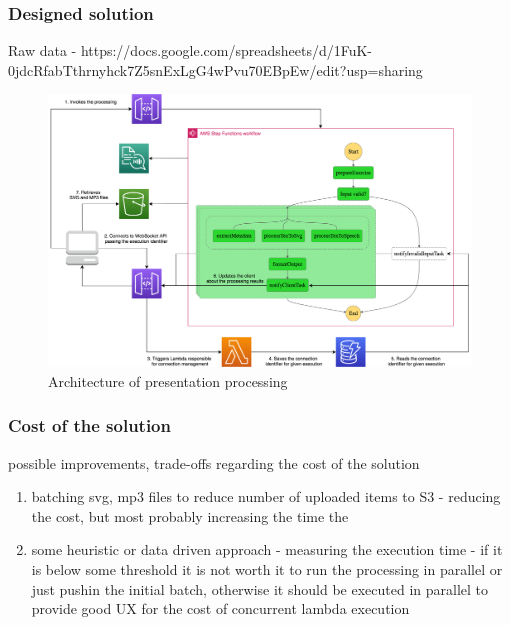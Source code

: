 


\subsubsection{Designed solution}

Raw data - https://docs.google.com/spreadsheets/d/1FuK-0jdcRfabTthrnyhck7Z5snExLgG4wPvu70EBpEw/edit?usp=sharing

\begin{figure}[H]
    \centering
    \includegraphics[width=1\textwidth]{assets/04-serverless-for-web-apps/euclidArchitecture.png}
    \caption{Architecture of presentation processing}
    \label{fig:euclid-web-app}
\end{figure}

\subsubsection{Cost of the solution}

possible improvements, trade-offs regarding the cost of the solution

\begin{enumerate}
    \item batching svg, mp3 files to reduce number of uploaded items to S3 - reducing the cost, but most probably increasing the time the 
    \item some heuristic or data driven approach - measuring the execution time - if it is below some threshold it is not worth it to run the processing in parallel or just pushin the initial batch, otherwise it should be executed in parallel to provide good UX for the cost of concurrent lambda execution
\end{enumerate}

